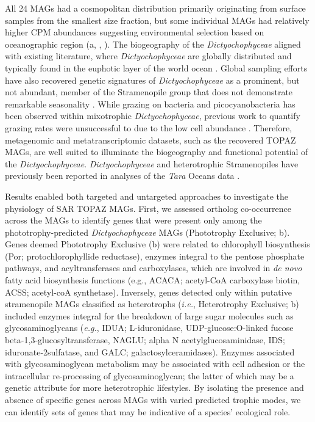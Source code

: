 \documentclass[12pt]{article}
\numberwithin{equation}{section}
\begin{document}
All 24 MAGs had a cosmopolitan distribution primarily originating from surface samples from the smallest size fraction, but some individual MAGs had relatively higher CPM abundances suggesting environmental selection based on oceanographic region (a, , ). The biogeography of the \textit{Dictyochophyceae} aligned with existing literature, where \textit{Dictyochophyceae} are globally distributed and typically found in the euphotic layer of the world ocean \citep{vaulot2008fmr, obiol2020mer, massana2011arm}. Global sampling efforts have also recovered genetic signatures of \textit{Dictyochophyceae} as a prominent, but not abundant, member of the Stramenopile group that does not demonstrate remarkable seasonality \citep{giner2019me, obiol2020mer}. While grazing on bacteria and picocyanobacteria has been observed within mixotrophic \textit{Dictyochophyceae}, previous work to quantify grazing rates were unsuccessful to due to the low cell abundance \citep{unrein2014ij}. Therefore, metagenomic and metatranscriptomic datasets, such as the recovered TOPAZ MAGs, are well suited to illuminate the biogeography and functional potential of the \textit{Dictyochophyceae}. \textit{Dictyochophyceae} and heterotrophic Stramenopiles have previously been reported in analyses of the \textit{Tara} Oceans data \citep{Carradec2018global, pierellakarlusich2020arms, vorobev2020gra, sieracki2019sr}.

Results enabled both targeted and untargeted approaches to investigate the physiology of SAR TOPAZ MAGs. First, we assessed ortholog co-occurrence across the MAGs to identify genes that were present only among the phototrophy-predicted \textit{Dictyochophyceae} MAGs (Phototrophy Exclusive; b). Genes deemed Phototrophy Exclusive (b) were related to chlorophyll biosynthesis (Por; protochlorophyllide reductase), enzymes integral to the pentose phosphate pathways, and acyltransferases and carboxylases, which are involved in \textit{de novo} fatty acid biosynthesis functions (e.g., ACACA; acetyl-CoA carboxylase biotin, ACSS; acetyl-coA synthetase). Inversely, genes detected only within putative stramenopile MAGs classified as heterotrophs (\textit{i.e.}, Heterotrophy Exclusive;  b) included enzymes integral for the breakdown of large sugar molecules such as glycosaminoglycans (\textit{e.g.}, IDUA; L-iduronidase, UDP-glucose:O-linked fucose beta-1,3-glucosyltransferase, NAGLU; alpha N acetylglucosaminidase, IDS; iduronate-2sulfatase, and GALC; galactosylceramidases). Enzymes associated with glycosaminoglycan metabolism may be associated with cell adhesion or the intracellular re-processing of glycosaminoglycan; the latter of which may be a genetic attribute for more heterotrophic lifestyles. By isolating the presence and absence of specific genes across MAGs with varied predicted trophic modes, we can identify sets of genes that may be indicative of a species' ecological role. 
\end{document}
